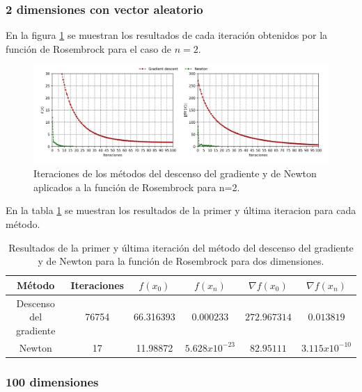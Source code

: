 \subsubsection{2 dimensiones con vector aleatorio}

En la figura \ref{fig:rosembrock_2_random} se muestran los resultados de cada iteración obtenidos por la función de Rosembrock para el caso de $n=2$.

\begin{figure}[H]
    \centering
    \includegraphics[width=17cm]{Graphics/Problema_2/rosembrock_2_random.png}
    \caption{Iteraciones de los métodos del descenso del gradiente y de Newton aplicados a la función de Rosembrock para n=2.}
    \label{fig:rosembrock_2_random}
\end{figure}

En la tabla \ref{table:rosembrock_2_random} se muestran los resultados de la primer y última iteracion para cada método.

\begin{table}[H]
    \centering
    \begin{tabular}{cccccc} \hline
        Método                 & Iteraciones & $f(x_0)$  & $f(x_n)$         & $\nabla f(x_0)$ & $\nabla f(x_n) $ \\ \hline
        Descenso del gradiente & 76754       & 66.316393 & $0.000233$       & $272.967314$    & $0.013819$       \\
        Newton                 & 17          & 11.98872  & $5.628x10^{-23}$ & $82.95111$      & $3.115x10^{-10}$ \\ \hline
    \end{tabular}
    \caption{Resultados de la primer y última iteración del método del descenso del gradiente y de Newton para la función de Rosembrock para dos dimensiones.}
    \label{table:rosembrock_2_random}
\end{table}

\subsubsection{100 dimensiones}

